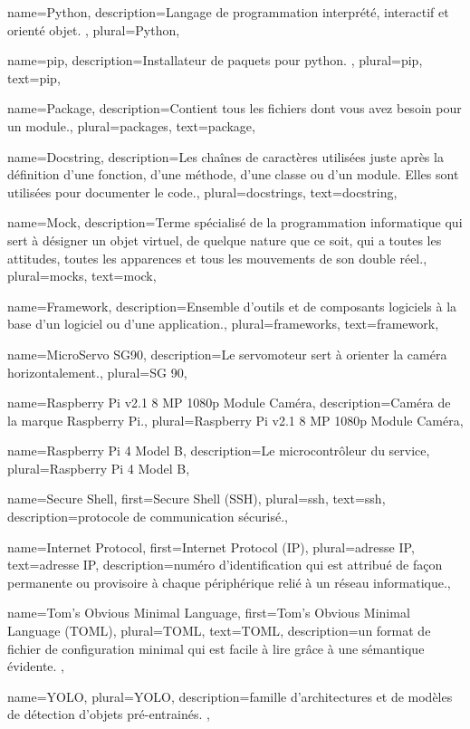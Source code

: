 {
    name={Python},
    description={Langage de programmation interprété, interactif et orienté objet. \cite{python}},
    plural={Python},
}

{
    name={pip},
    description={Installateur de \glspl{paquet} pour \gls{python}. \cite{pip}},
    plural={pip},
    text={pip},
}

{
    name={Package},
    description={Contient tous les fichiers dont vous avez besoin pour un module.},
    plural={packages},
    text={package},
}

{
    name={Docstring},
    description={Les chaînes de caractères utilisées juste après la définition d'une fonction, d'une méthode, d'une
            classe ou d'un module. Elles sont utilisées pour documenter le code.},
    plural={docstrings},
    text={docstring},
}

{
    name={Mock},
    description={Terme spécialisé de la programmation informatique qui sert à désigner un objet virtuel, de quelque
            nature que ce soit, qui a toutes les attitudes, toutes les apparences et tous les mouvements de son double
            réel.},
    plural={mocks},
    text={mock},
}

{
    name={Framework},
    description={Ensemble d'outils et de composants logiciels à la base d'un logiciel ou d'une application.},
    plural={frameworks},
    text={framework},
}

{
    name={MicroServo SG90},
    description={Le servomoteur sert à orienter la caméra horizontalement.},
    plural={SG 90},
}

{
    name={Raspberry Pi v2.1 8 MP 1080p Module Caméra},
    description={Caméra de la marque Raspberry Pi.},
    plural={Raspberry Pi v2.1 8 MP 1080p Module Caméra},
}

{
    name={Raspberry Pi 4 Model B},
    description={Le microcontrôleur du service},
    plural={Raspberry Pi 4 Model B},
}

{
    name={Secure Shell},
    first={Secure Shell (SSH)},
    plural={ssh},
    text={ssh},
    description={protocole de communication sécurisé.},
}

{
    name={Internet Protocol},
    first={Internet Protocol (IP)},
    plural={adresse IP},
    text={adresse IP},
    description={numéro d'identification qui est attribué de façon permanente ou provisoire à chaque périphérique relié
            à un réseau informatique.},
}

{
    name={Tom's Obvious Minimal Language},
    first={Tom's Obvious Minimal Language (TOML)},
    plural={TOML},
    text={TOML},
    description={un format de fichier de configuration minimal qui est facile à lire grâce à une sémantique évidente.
            \cite{toml}},
}

{
    name={YOLO},
    plural={YOLO},
    description={famille d'architectures et de modèles de détection d'objets pré-entrainés.
            \cite{yolo}},
}
